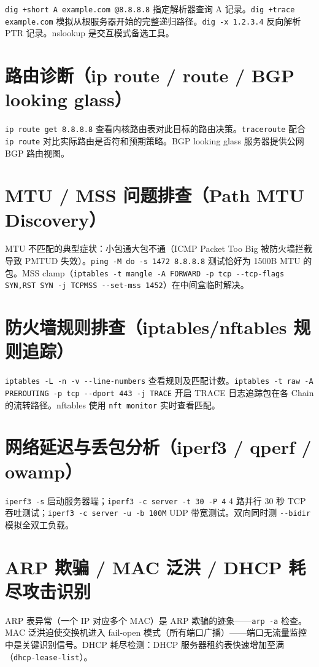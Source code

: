 \documentclass[12pt,UTF8]{ctexbook}
\begin{document}
\verb|dig +short A example.com @8.8.8.8| 指定解析器查询 A 记录。\verb|dig +trace example.com| 模拟从根服务器开始的完整递归路径。\verb|dig -x 1.2.3.4| 反向解析 PTR 记录。nslookup 是交互模式备选工具。

  \section{路由诊断（ip route / route / BGP looking glass）}

\verb|ip route get 8.8.8.8| 查看内核路由表对此目标的路由决策。\verb|traceroute| 配合 \verb|ip route| 对比实际路由是否符和预期策略。BGP looking glass 服务器提供公网 BGP 路由视图。

  \section{MTU / MSS 问题排查（Path MTU Discovery）}

MTU 不匹配的典型症状：小包通大包不通（ICMP Packet Too Big 被防火墙拦截导致 PMTUD 失效）。\verb|ping -M do -s 1472 8.8.8.8| 测试恰好为 1500B MTU 的包。MSS clamp（\verb|iptables -t mangle -A FORWARD -p tcp --tcp-flags SYN,RST SYN -j TCPMSS --set-mss 1452|）在中间盒临时解决。

  \section{防火墙规则排查（iptables/nftables 规则追踪）}

\verb|iptables -L -n -v --line-numbers| 查看规则及匹配计数。\verb|iptables -t raw -A PREROUTING -p tcp --dport 443 -j TRACE| 开启 TRACE 日志追踪包在各 Chain 的流转路径。nftables 使用 \verb|nft monitor| 实时查看匹配。

  \section{网络延迟与丢包分析（iperf3 / qperf / owamp）}

\verb|iperf3 -s| 启动服务器端；\verb|iperf3 -c server -t 30 -P 4| 4 路并行 30 秒 TCP 吞吐测试；\verb|iperf3 -c server -u -b 100M| UDP 带宽测试。双向同时测 \verb|--bidir| 模拟全双工负载。

  \section{ARP 欺骗 / MAC 泛洪 / DHCP 耗尽攻击识别}

ARP 表异常（一个 IP 对应多个 MAC）是 ARP 欺骗的迹象——\verb|arp -a| 检查。MAC 泛洪迫使交换机进入 fail-open 模式（所有端口广播）——端口无流量监控中是关键识别信号。DHCP 耗尽检测：DHCP 服务器租约表快速增加至满（\verb|dhcp-lease-list|）。
\end{document}
